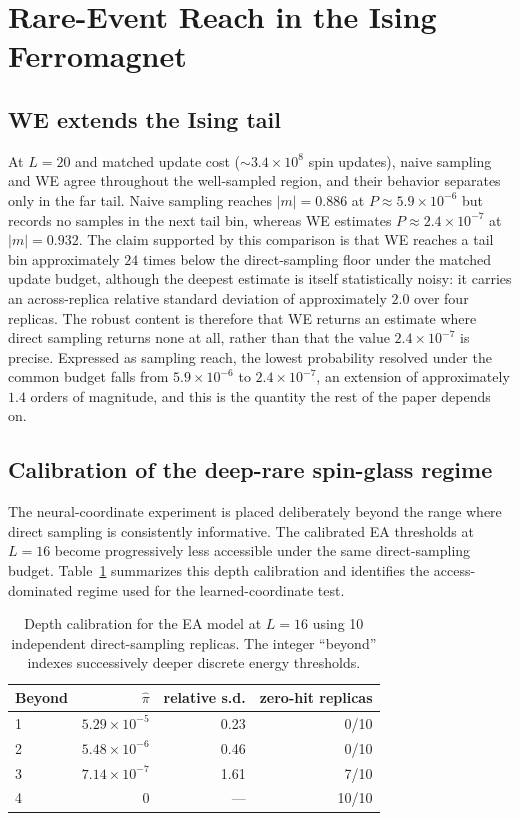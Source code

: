 \documentclass[a4paper,fleqn]{cas-sc}
\begin{document}
\FloatBarrier

\section{Rare-Event Reach in the Ising Ferromagnet}\label{sec:tail}

\subsection{WE extends the Ising tail}\label{sec:tailreach}
At $L=20$ and matched update cost ($\sim3.4\times10^{8}$ spin updates), naive sampling and WE
agree throughout the well-sampled region, and their behavior separates only in the far tail.
Naive sampling reaches $|m|=0.886$ at $P\approx5.9\times10^{-6}$ but records no samples in the
next tail bin, whereas WE estimates $P\approx2.4\times10^{-7}$ at $|m|=0.932$. The claim supported by this comparison is that WE reaches a tail bin
approximately $24$ times below the direct-sampling floor under the matched update budget,
although the deepest estimate is itself statistically noisy: it carries an across-replica
relative standard deviation of approximately $2.0$ over four replicas. The robust content is
therefore that WE returns an estimate where direct sampling returns none at all, rather than
that the value $2.4\times10^{-7}$ is precise. Expressed as sampling reach, the lowest probability
resolved under the common budget falls from $5.9\times10^{-6}$ to $2.4\times10^{-7}$, an
extension of approximately $1.4$ orders of magnitude, and this is the quantity the rest of the
paper depends on.



\subsection{Calibration of the deep-rare spin-glass regime}\label{sec:depth}
The neural-coordinate experiment is placed deliberately beyond the range where direct sampling
is consistently informative. The calibrated EA thresholds at $L=16$ become progressively less
accessible under the same direct-sampling budget. Table~\ref{tab:depth} summarizes this depth
calibration and identifies the access-dominated regime used for the learned-coordinate test.

\begin{table}[H]
\centering\small
\caption{Depth calibration for the EA model at $L=16$ using 10 independent direct-sampling
replicas. The integer ``beyond'' indexes successively deeper discrete energy thresholds.}
\label{tab:depth}
\begin{tabular}{lrrr}
\toprule
Beyond & $\hat\pi$ & relative s.d. & zero-hit replicas \\
\midrule
1 & $5.29\times10^{-5}$ & 0.23 & 0/10 \\
2 & $5.48\times10^{-6}$ & 0.46 & 0/10 \\
3 & $7.14\times10^{-7}$ & 1.61 & 7/10 \\
4 & $0$ & --- & 10/10 \\
\bottomrule
\end{tabular}
\end{table}
\end{document}
